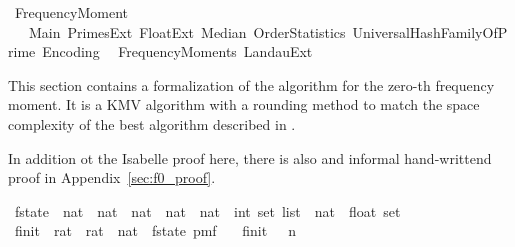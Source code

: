 %
\begin{isabellebody}%
%
%
\isadelimdocument
%
\endisadelimdocument
%
\isatagdocument
%
\isamarkuptrue%
%
\endisatagdocument
{\isafolddocument}%
%
\isadelimdocument
%
\endisadelimdocument
%
\isadelimtheory
%
\endisadelimtheory
%
\isatagtheory
{}\isamarkupfalse%
\ Frequency{\isacharunderscore}{\kern0pt}Moment{\isacharunderscore}{\kern0pt}{}\isanewline
\ \ \ Main\ Primes{\isacharunderscore}{\kern0pt}Ext\ Float{\isacharunderscore}{\kern0pt}Ext\ Median\ OrderStatistics\ UniversalHashFamilyOfPrime\ Encoding\isanewline
\ \ Frequency{\isacharunderscore}{\kern0pt}Moments\ Landau{\isacharunderscore}{\kern0pt}Ext\isanewline
{}%
\endisatagtheory
{\isafoldtheory}%
%
\isadelimtheory
%
\endisadelimtheory
%
\begin{isamarkuptext}%
This section contains a formalization of the algorithm for the zero-th frequency moment.
It is a KMV algorithm with a rounding method to match the space complexity of the best
algorithm described in \cite{baryossef2002}.%
\end{isamarkuptext}\isamarkuptrue%
%
\begin{isamarkuptext}%
In addition ot the Isabelle proof here, there is also and informal hand-writtend proof in
Appendix~\ref{sec:f0_proof}.%
\end{isamarkuptext}\isamarkuptrue%
\isamarkupfalse%
\ f{}{\isacharunderscore}{\kern0pt}state\ {\isacharequal}{\kern0pt}\ {\isachardoublequoteopen}nat\ {\isasymtimes}\ nat\ {\isasymtimes}\ nat\ {\isasymtimes}\ nat\ {\isasymtimes}\ {\isacharparenleft}{\kern0pt}nat\ {\isasymRightarrow}\ {\isacharparenleft}{\kern0pt}int\ set\ list{\isacharparenright}{\kern0pt}{\isacharparenright}{\kern0pt}\ {\isasymtimes}\ {\isacharparenleft}{\kern0pt}nat\ {\isasymRightarrow}\ float\ set{\isacharparenright}{\kern0pt}{\isachardoublequoteclose}\isanewline
\isanewline
{}\isamarkupfalse%
\ f{}{\isacharunderscore}{\kern0pt}init\ {\isacharcolon}{\kern0pt}{\isacharcolon}{\kern0pt}\ {\isachardoublequoteopen}rat\ {\isasymRightarrow}\ rat\ {\isasymRightarrow}\ nat\ {\isasymRightarrow}\ f{}{\isacharunderscore}{\kern0pt}state\ pmf{\isachardoublequoteclose}\ \isanewline
\ \ {\isachardoublequoteopen}f{}{\isacharunderscore}{\kern0pt}init\ {\isasymdelta}\ {\isasymepsilon}\ n\ {\isacharequal}{\kern0pt}\isanewline

\end{isabellebody}
